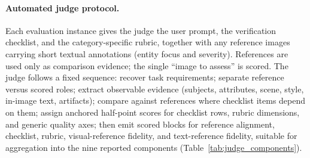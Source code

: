 
\paragraph{Automated judge protocol.}
Each evaluation instance gives the judge the user prompt, the verification checklist, and the category-specific rubric, together with any reference images carrying short textual annotations (entity focus and severity).
References are used only as comparison evidence; the single ``image to assess'' is scored.
The judge follows a fixed sequence: recover task requirements; separate reference versus scored roles; extract observable evidence (subjects, attributes, scene, style, in-image text, artifacts); compare against references where checklist items depend on them; assign anchored half-point scores for checklist rows, rubric dimensions, and generic quality axes; then emit scored blocks for reference alignment, checklist, rubric, visual-reference fidelity, and text-reference fidelity, suitable for aggregation into the nine reported components (Table~\ref{tab:judge_components}).

